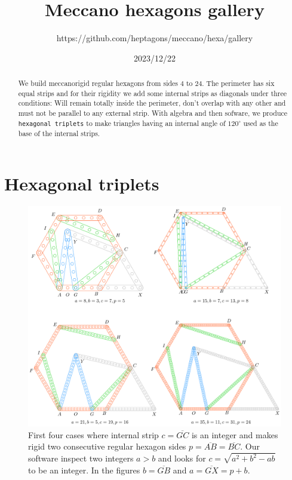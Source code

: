 \documentclass[11pt]{article}
\title{Meccano hexagons gallery}
\author{https://github.com/heptagons/meccano/hexa/gallery}
\date{2023/12/22}
\begin{document}
\maketitle
\begin{abstract}
We build meccano\meccanoref rigid regular hexagons from sides $4$ to $24$. The perimeter has six equal strips and for their rigidity we add some internal strips as diagonals under three conditions: Will remain totally inside the perimeter, don't overlap with any other and must not be parallel to any external strip. With algebra and then sofware, we produce \texttt{hexagonal triplets} to make triangles having an internal angle of $120^\circ$ used as the base of the internal strips.
\end{abstract}

\section{Hexagonal triplets}

\begin{figure}[h]
\centering
\includegraphics[scale=0.9]{build/hexa-builder-a}
\caption{First four cases where internal strip $c = \overline{GC}$ is an integer and makes rigid two consecutive regular hexagon sides $p = \overline{AB} = \overline{BC}$. Our software inspect two integers $a > b$ and looks for $c = \sqrt{a^2+b^2-ab}$ to be an integer. In the figures $b = \overline{GB}$ and $a = \overline{GX} = p + b$. }
\label{fig:builder-a}
\end{figure}
\end{document}
